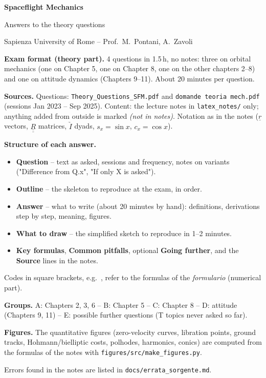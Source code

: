 \begin{titlepage}
\centering
\vspace*{2.5cm}
{\Huge\bfseries Spaceflight Mechanics\par}
\vspace{0.6cm}
{\LARGE Answers to the theory questions\par}
\vspace{0.4cm}
{\large Sapienza University of Rome -- Prof.\ M.\ Pontani, A.\ Zavoli\par}
\vspace{1.5cm}
\begin{minipage}{0.82\linewidth}
\small
\textbf{Exam format (theory part).} 4 questions in 1.5\,h, no notes: three on orbital mechanics (one on Chapter 5, one on
Chapter 8, one on the other chapters 2--8) and one on attitude dynamics (Chapters 9--11). About 20 minutes per question.

\medskip
\textbf{Sources.} Questions: \texttt{Theory\_Questions\_SFM.pdf} and \texttt{domande teoria mech.pdf} (sessions Jan 2023 -- Sep 2025).
Content: the lecture notes in \texttt{latex\_notes/} only; anything added from outside is marked \textit{(not in notes)}.
Notation as in the notes ($\underline r$ vectors, $\underline{\underline R}$ matrices, $\underrightarrow I$ dyads, $s_x=\sin x$, $c_x=\cos x$).

\medskip
\textbf{Structure of each answer.}
\begin{itemize}
\item \textbf{Question} -- text as asked, sessions and frequency, notes on variants ("Difference from Q.x", "If only X is asked").
\item \textbf{Outline} -- the skeleton to reproduce at the exam, in order.
\item \textbf{Answer} -- what to write (about 20 minutes by hand): definitions, derivations step by step, meaning, figures.
\item \textbf{What to draw} -- the simplified sketch to reproduce in 1--2 minutes.
\item \textbf{Key formulas}, \textbf{Common pitfalls}, optional \textbf{Going further}, and the \textbf{Source} lines in the notes.
\end{itemize}
Codes in square brackets, e.g.\ , refer to the formulas of the \emph{formulario} (numerical part).

\medskip
\textbf{Groups.} A: Chapters 2, 3, 6 -- B: Chapter 5 -- C: Chapter 8 -- D: attitude (Chapters 9, 11) -- E: possible further questions
(T topics never asked so far).

\medskip
\textbf{Figures.} The quantitative figures (zero-velocity curves, libration points, ground tracks, Hohmann/bielliptic costs,
polhodes, harmonics, conics) are computed from the formulas of the notes with \texttt{figures/src/make\_figures.py}.
\end{minipage}
\vfill
{\small Errors found in the notes are listed in \texttt{docs/errata\_sorgente.md}.}
\end{titlepage}

